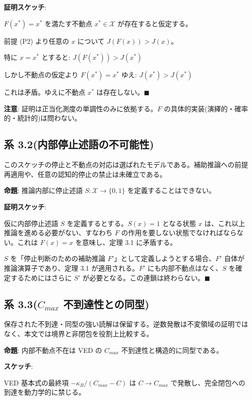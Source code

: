 \textbf{証明スケッチ}:

$F(x^*) = x^*$ を満たす不動点 $x^* \in \mathcal{X}$ が存在すると仮定する。

前提 (P2) より任意の $x$ について $J(F(x)) > J(x)$。

特に $x = x^*$ とすると: $J(F(x^*)) > J(x^*)$

しかし不動点の仮定より $F(x^*) = x^*$ ゆえ: $J(x^*) > J(x^*)$

これは矛盾。ゆえに不動点 $x^*$ は存在しない。$\blacksquare$

\textbf{注意}: 証明は正当化測度の単調性のみに依拠する。$F$ の具体的実装(演繹的・確率的・統計的)は問わない。

\bigskip


\subsection{系 3.2(内部停止述語の不可能性)}

このスケッチの停止と不動点の対応は選ばれたモデルである。補助推論への前提再適用や、任意の認知的停止の禁止は未確立である。


\textbf{命題}: 推論内部に停止述語 $S: \mathcal{X} \to \{0, 1\}$ を定義することはできない。

\textbf{証明スケッチ}:

仮に内部停止述語 $S$ を定義するとする。$S(x) = 1$ となる状態 $x$ は、これ以上推論を進める必要がない、すなわち $F$ の作用を要しない状態でなければならない。これは $F(x) = x$ を意味し、定理 3.1 に矛盾する。

$S$ を「停止判断のための補助推論 $F'$」として定義しようとする場合、$F'$ 自体が推論演算子であり、定理 3.1 が適用される。$F'$ にも内部不動点はなく、$S$ を確定するためにはさらに $S'$ が必要となる。この連鎖は終わらない。$\blacksquare$

\bigskip


\subsection{系 3.3($C_{max}$ 不到達性との同型)}

保存された不到達・同型の強い読解は保留する。逆数発散は不変領域の証明ではなく、本文では境界と非閉包を役割上比較する。


\textbf{命題}: 内部不動点不在は VED の $C_{max}$ 不到達性と構造的に同型である。

\textbf{スケッチ}:

VED 基本式の最終項 $-\kappa_B/(C_{max} - C)$ は $C \to C_{max}$ で発散し、完全閉包への到達を動力学的に禁じる。

